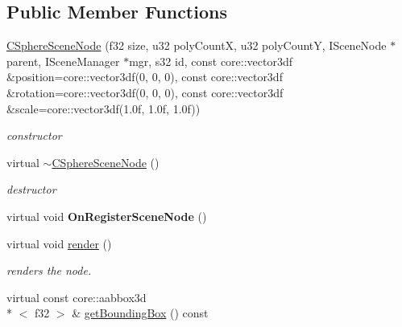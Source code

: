 \subsection*{Public Member Functions}
\begin{DoxyCompactItemize}
\item 
\hypertarget{classirr_1_1scene_1_1_c_sphere_scene_node_ab2d82770f385665c7ecfdf17747f1cc6}{\hyperlink{classirr_1_1scene_1_1_c_sphere_scene_node_ab2d82770f385665c7ecfdf17747f1cc6}{C\-Sphere\-Scene\-Node} (f32 size, u32 poly\-Count\-X, u32 poly\-Count\-Y, I\-Scene\-Node $\ast$parent, I\-Scene\-Manager $\ast$mgr, s32 id, const core\-::vector3df \&position=core\-::vector3df(0, 0, 0), const core\-::vector3df \&rotation=core\-::vector3df(0, 0, 0), const core\-::vector3df \&scale=core\-::vector3df(1.\-0f, 1.\-0f, 1.\-0f))}\label{classirr_1_1scene_1_1_c_sphere_scene_node_ab2d82770f385665c7ecfdf17747f1cc6}

\begin{DoxyCompactList}\small\item\em constructor \end{DoxyCompactList}\item 
\hypertarget{classirr_1_1scene_1_1_c_sphere_scene_node_afae13bc1bf098376697ec6ae88ca4faf}{virtual \hyperlink{classirr_1_1scene_1_1_c_sphere_scene_node_afae13bc1bf098376697ec6ae88ca4faf}{$\sim$\-C\-Sphere\-Scene\-Node} ()}\label{classirr_1_1scene_1_1_c_sphere_scene_node_afae13bc1bf098376697ec6ae88ca4faf}

\begin{DoxyCompactList}\small\item\em destructor \end{DoxyCompactList}\item 
\hypertarget{classirr_1_1scene_1_1_c_sphere_scene_node_a6e8c3339d9a731ff4aee292c3dc62932}{virtual void {\bfseries On\-Register\-Scene\-Node} ()}\label{classirr_1_1scene_1_1_c_sphere_scene_node_a6e8c3339d9a731ff4aee292c3dc62932}

\item 
\hypertarget{classirr_1_1scene_1_1_c_sphere_scene_node_a54c7af229fc8982e9ffdb833a19be4f3}{virtual void \hyperlink{classirr_1_1scene_1_1_c_sphere_scene_node_a54c7af229fc8982e9ffdb833a19be4f3}{render} ()}\label{classirr_1_1scene_1_1_c_sphere_scene_node_a54c7af229fc8982e9ffdb833a19be4f3}

\begin{DoxyCompactList}\small\item\em renders the node. \end{DoxyCompactList}\item 
\hypertarget{classirr_1_1scene_1_1_c_sphere_scene_node_afe1ee95c7606cb9ae06630f14a004b6e}{virtual const core\-::aabbox3d\\*
$<$ f32 $>$ \& \hyperlink{classirr_1_1scene_1_1_c_sphere_scene_node_afe1ee95c7606cb9ae06630f14a004b6e}{get\-Bounding\-Box} () const }\label{classirr_1_1scene_1_1_c_sphere_scene_node_afe1ee95c7606cb9ae06630f14a004b6e}


\end{DoxyCompactItemize}
